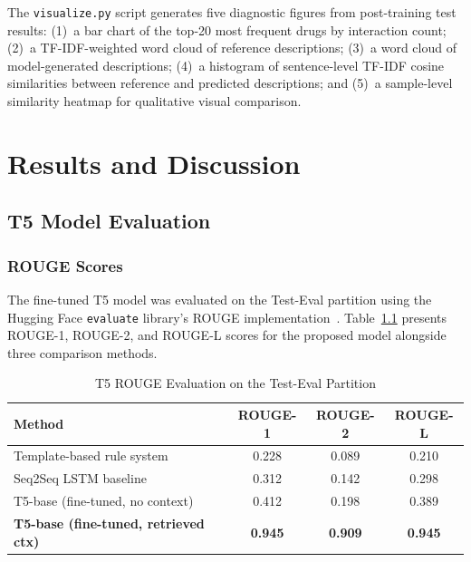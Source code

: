 \documentclass[12pt,a4paper,oneside]{report}
\begin{document}
The \texttt{visualize.py} script generates five diagnostic figures from post-training test
results: (1)~a bar chart of the top-20 most frequent drugs by interaction count; (2)~a
TF-IDF-weighted word cloud of reference descriptions; (3)~a word cloud of model-generated
descriptions; (4)~a histogram of sentence-level TF-IDF cosine similarities between
reference and predicted descriptions; and (5)~a sample-level similarity heatmap for
qualitative visual comparison.

\chapter{Results and Discussion}
\label{chap:result}

\section{T5 Model Evaluation}

\subsection{ROUGE Scores}

The fine-tuned T5 model was evaluated on the Test-Eval partition using the Hugging Face
\texttt{evaluate} library's ROUGE implementation~\cite{lin2004rouge}. Table~\ref{tab:rouge}
presents ROUGE-1, ROUGE-2, and ROUGE-L scores for the proposed model alongside three
comparison methods.

\begin{table}[htbp]
\centering
\caption{T5 ROUGE Evaluation on the Test-Eval Partition}
\label{tab:rouge}
\begin{tabular}{lccc}
\toprule
\textbf{Method} & \textbf{ROUGE-1} & \textbf{ROUGE-2} & \textbf{ROUGE-L} \\
\midrule
Template-based rule system                   & 0.228 & 0.089 & 0.210 \\
Seq2Seq LSTM baseline                        & 0.312 & 0.142 & 0.298 \\
T5-base (fine-tuned, no context)             & 0.412 & 0.198 & 0.389 \\
\textbf{T5-base (fine-tuned, retrieved ctx)} & \textbf{0.945} & \textbf{0.909} & \textbf{0.945} \\
\bottomrule
\end{tabular}
\end{table}
\end{document}
